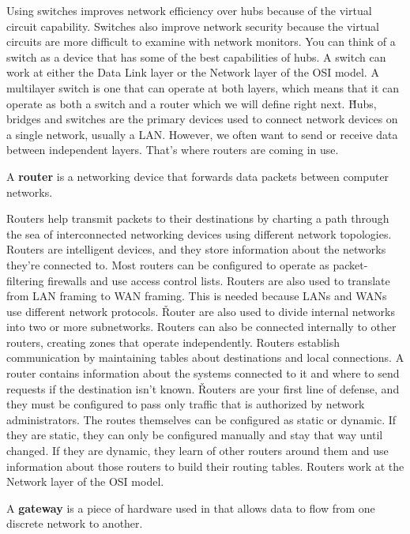 Using switches improves network efficiency over hubs because of the virtual circuit capability. Switches also improve
network security because the virtual circuits are more difficult to examine with network monitors. You can think of a
switch as a device that has some of the best capabilities of hubs. A switch can work at either the Data Link layer or
the Network layer of the OSI model. A multilayer switch is one that can operate at both layers, which means that it
can operate as both a switch and a router which we will define right next. \v

Hubs, bridges and switches are the primary devices used to connect network devices on a single network, usually a LAN\@.
However, we often want to send or receive data between independent layers. That's where routers are coming in use.

\bd[Router]
A \textbf{router} is a networking device that forwards data packets between computer networks.
\ed


Routers help transmit packets to their destinations by charting a path through the sea of interconnected networking
devices using different network topologies. Routers are intelligent devices, and they store information about the
networks they're connected to. Most routers can be configured to operate as packet-filtering firewalls and use access
control lists. Routers are also used to translate from LAN framing to WAN framing. This is needed because LANs and
WANs use different network protocols. \v

Router are also used to divide internal networks into two or more subnetworks. Routers can also be connected
internally to other routers, creating zones that operate independently. Routers establish communication by
maintaining tables about destinations and local connections. A router contains information about the systems
connected to it and where to send requests if the destination isn't known. \v

Routers are your first line of defense, and they must be configured to pass only traffic that is authorized by
network administrators. The routes themselves can be configured as static or dynamic. If they are static, they can
only be configured manually and stay that way until changed. If they are dynamic, they learn of other routers around
them and use information about those routers to build their routing tables. Routers work at the Network layer of the
OSI model.

\bd[Gateway]
A \textbf{gateway} is a piece of hardware used in that allows data to flow from one discrete network to another.
\ed

